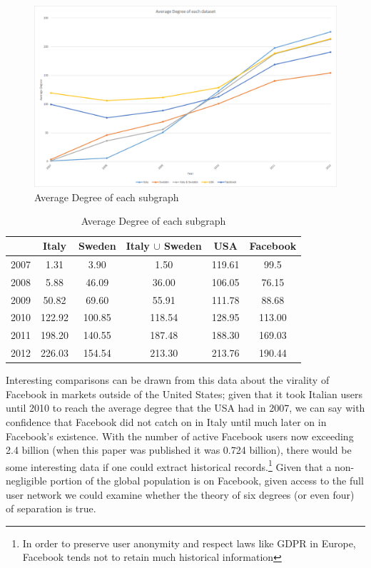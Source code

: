     \begin{figure}[H]
        \centering
        \includegraphics[width=\textwidth]{journals/SR-AverageDegree.png}
        \caption{Average Degree of each subgraph}
        \label{fig:avdeg}
    \end{figure}
    \begin{table}[H]
        \centering
        \begin{tabular}{c|c|c|c|c|c}
            \toprule
            & Italy & Sweden & Italy $\cup$ Sweden & USA & Facebook \\
            \midrule
            2007 & 1.31 & 3.90 & 1.50 & 119.61 & 99.5 \\
            2008 & 5.88 & 46.09 & 36.00 & 106.05 & 76.15 \\
            2009 & 50.82 & 69.60 & 55.91 & 111.78 & 88.68 \\
            2010 & 122.92 & 100.85 & 118.54 & 128.95 & 113.00 \\
            2011 & 198.20 & 140.55 & 187.48 & 188.30 & 169.03 \\
            2012 & 226.03 & 154.54 & 213.30 & 213.76 & 190.44 \\
            \bottomrule
        \end{tabular}
        \caption{Average Degree of each subgraph}
        \label{tab:avdeg}
    \end{table}
    
    Interesting comparisons can be drawn from this data about the virality of Facebook in markets outside of the United States; given that it took Italian users until 2010 to reach the average degree that the USA had in 2007, we can say with confidence that Facebook did not catch on in Italy until much later on in Facebook's existence. With the number of active Facebook users now exceeding 2.4 billion (when this paper was published it was 0.724 billion), there would be some interesting data if one could extract historical records.\footnote{In order to preserve user anonymity and respect laws like GDPR in Europe, Facebook tends not to retain much historical information} Given that a non-negligible portion of the global population is on Facebook, given access to the full user network we could examine whether the theory of six degrees (or even four) of separation is true.
    
